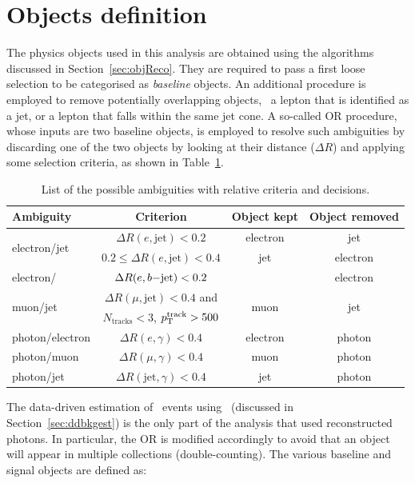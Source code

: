	\section{Objects definition}
	\label{sec:obj_def}
			
		The physics objects used in this analysis are obtained using the algorithms discussed in Section~\ref{sec:objReco}. They are required to pass a first loose selection to be categorised as \emph{baseline} objects. An additional procedure is employed to remove potentially overlapping objects, \eg\ a lepton that is identified as a jet, or a lepton that falls within the same jet cone. A so-called \ac{OR} procedure, whose inputs are two baseline objects, is employed to resolve such ambiguities by discarding one of the two objects by looking at their distance ($\Delta R$) and applying some selection criteria, as shown in Table~\ref{tab:OR}. 

		\begin{table}[!htb]\centering\caption{List of the possible ambiguities with relative criteria and decisions.}
		\renewcommand{\arraystretch}{1.3}
			\begin{tabular}{lccc}
				\toprule 
				\textbf{Ambiguity} & \textbf{Criterion} & \textbf{Object kept} & \textbf{Object removed}\\
				\toprule
				\multirow{2}{*}{electron/jet} & $\Delta R (e,\mathrm{jet}) < 0.2$ & electron & jet\\
				& $0.2 \leq \Delta R (e,\mathrm{jet}) < 0.4$ & jet & electron \\\midrule
				electron/\bj & $\Delta R (e,b\mathrm{-jet}) < 0.2$ & \bj\ & electron\\ \midrule
				\multirow{2}{*}{muon/jet} & $\Delta R (\mu,\mathrm{jet}) < 0.4$ and & \multirow{2}{*}{muon} & \multirow{2}{*}{jet} \\ 
						& $N_{\mathrm{tracks}} < 3$, $p_{\mathrm{T}}^{\mathrm{track}} > 500$ \MeV &  &  \\ \midrule
				photon/electron & $\Delta R (e,\gamma) < 0.4$ & electron & photon\\ 
				photon/muon & $\Delta R (\mu,\gamma) < 0.4$ & muon & photon\\ 
				photon/jet & $\Delta R (\mathrm{jet}, \gamma) < 0.4$ & jet & photon\\ 
				\bottomrule
				\end{tabular}
				\label{tab:OR}
		\end{table}

		The data-driven estimation of \ttZ\ events using \ttgamma\ (discussed in Section~\ref{sec:ddbkgest}) is the only part of the analysis that used reconstructed photons. In particular, the \ac{OR} is modified accordingly to avoid that an object will appear in multiple collections (double-counting). The various baseline and signal objects are defined as:

